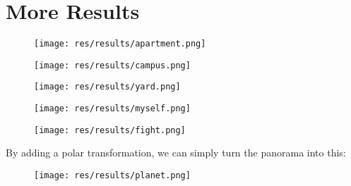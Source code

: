 
\section{More Results}
\begin{figure}[H]
  \centering
  \texttt{[image: res/results/apartment.png]}
\end{figure}
\begin{figure}[H]
  \centering
  \texttt{[image: res/results/campus.png]}
\end{figure}

\begin{figure}[H]
  \centering
  \texttt{[image: res/results/yard.png]}
\end{figure}

\begin{figure}[H]
  \centering
  \texttt{[image: res/results/myself.png]}
\end{figure}

\begin{figure}[H]
  \centering
  \texttt{[image: res/results/fight.png]}
\end{figure}

\newpage
By adding a polar transformation, we can simply turn the panorama into this:

\begin{figure}[H]
  \centering
  \texttt{[image: res/results/planet.png]}
\end{figure}
